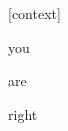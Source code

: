 \documentclass[varwidth]{standalone}
\begin{document}
\begin{CJK*}{UTF8}{gbsn}
{\setlength{\fboxsep}{0pt}\colorbox{white!0}{\parbox{0.9\textwidth}{
\colorbox{red!1.8390840291976929}{\strut [context]} \colorbox{red!16.222637176513672}{\strut you} \colorbox{red!43.043251037597656}{\strut are} \colorbox{red!38.8950309753418}{\strut right} 
}}}
\end{CJK*}
\end{document}
